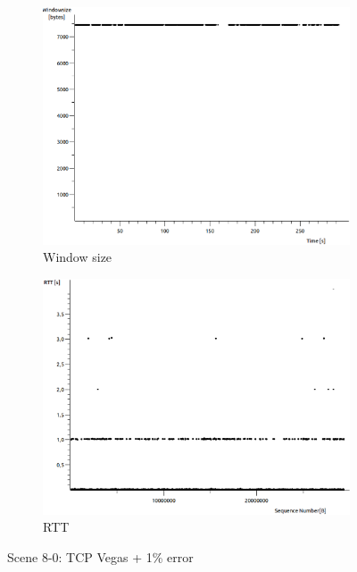 \documentclass[conference,a4paper]{../../sty/IEEEtran}
\begin{document}
\begin{figure}
\begin{subfigure}[b]{0.2\textwidth}
  \includegraphics[width=\textwidth]{s8-0_wsize}
  \caption{Window size}
 \end{subfigure}
 \begin{subfigure}[b]{0.2\textwidth}
  \includegraphics[width=\textwidth]{s8-0_rtt}
  \caption{RTT}
 \end{subfigure}
 \caption{Scene 8-0: TCP Vegas + 1\% error}
\end{figure}
\end{document}
